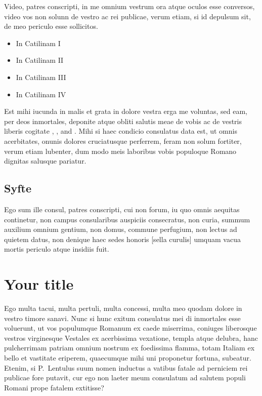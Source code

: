 \documentclass[a4paper,12pt,twoside,swedish]{report}
\begin{document}
Video, patres conscripti, in me omnium vestrum ora atque oculos esse
conversos, video vos non solunn de vestro ac rei publicae, verum etiam,
si id depulsum sit, de meo periculo esse sollicitos. 
\begin{itemize}
\item In Catilinam I
\item In Catilinam II
\item In Catilinam III
\item In Catilinam IV
\end{itemize}
Est mihi iucunda in
malis et grata in dolore vestra erga me voluntas, sed eam, per deos
inmortales, deponite atque obliti salutis meae de vobis ac de vestris
liberis cogitate \cite{AbTaRu:54},  \cite{Abl:56}, \cite{Keo:58} and \cite{Pow:85}. Mihi si haec condicio consulatus data est, ut omnis
acerbitates, onunis dolores cruciatusque perferrem, feram non solum
fortiter, verum etiam lubenter, dum modo meis laboribus vobis populoque
Romano dignitas salusque pariatur.


\section{Syfte}

Ego sum ille consul, patres
conscripti, cui non forum, iu quo omnis aequitas continetur, non campus
consularibus auspiciis consecratus, non curia, summum auxilium omnium
gentium, non domus, commune perfugium, non lectus ad quietem datus, non
denique haec sedes honoris [sella curulis] umquam vacua mortis periculo
atque insidiis fuit. 


\chapter{Your title}

 Ego multa tacui, multa pertuli, multa concessi,
multa meo quodam dolore in vestro timore sanavi. Nunc si hunc exitum
consulatus mei di inmortales esse voluerunt, ut vos populumque Romanum
ex caede miserrima, coniuges liberosque vestros virginesque Vestales ex
acerbissima vexatione, templa atque delubra, hanc pulcherrimam patriam
omnium nostrum ex foedissima flamma, totam Italiam ex bello et vastitate
eriperem, quaecumque mihi uni proponetur fortuna, subeatur. Etenim, si
P.~Lentulus suum nomen inductus a vatibus fatale ad perniciem rei
publicae fore putavit, cur ego non laeter meum consulatum ad salutem
populi Romani prope fatalem extitisse?
\end{document}
